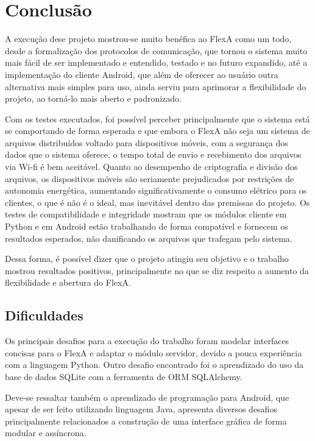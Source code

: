 
\chapter{Conclusão}
\label{cap5}

    A execução dese projeto mostrou-se muito benéfica ao FlexA como um todo, desde a formalização dos protocolos de comunicação, que tornou o sistema muito mais fácil de ser implementado e entendido, testado e no futuro expandido, até a implementação do cliente Android, que além de oferecer ao usuário outra alternativa mais simples para uso, ainda serviu para aprimorar a flexibilidade do projeto, ao torná-lo mais aberto e padronizado.
    
    Com os testes executados, foi possível perceber principalmente que o sistema está se comportando de forma esperada e que embora o FlexA não seja um sistema de arquivos distribuídos voltado para dispositivos móveis, com a segurança dos dados que o sistema oferece, o tempo total de envio e recebimento dos arquivos via Wi-fi é bem aceitável. Quanto ao desempenho de criptografia e divisão dos arquivos, os dispositivos móveis são seriamente prejudicados por restrições de autonomia energética, aumentando significativamente o consumo elétrico para os clientes, o que é não é o ideal, mas inevitável dentro das premissas do projeto. Os testes de compatibilidade e integridade mostram que os módulos cliente em Python e em Android estão trabalhando de forma compatível e fornecem os resultados esperados, não danificando os arquivos que trafegam pelo sistema.
    
    Dessa forma, é possível dizer que o projeto atingiu seu objetivo e o trabalho mostrou resultados positivos, principalmente no que se diz respeito a aumento da flexibilidade e abertura do FlexA.
    
    
    \section{Dificuldades}
    
    Os principais desafios para a execução do trabalho foram modelar interfaces concisas para o FlexA e adaptar o módulo servidor, devido a pouca experiência com a linguagem Python. Outro desafio encontrado foi  o aprendizado do uso da base de dados SQLite com a ferramenta de ORM SQLAlchemy.
    
    Deve-se ressaltar também o aprendizado de programação para Android, que apesar de ser feito utilizando linguagem Java, apresenta diversos desafios principalmente relacionados a construção de uma interface gráfica de forma modular e assíncrona.
    
